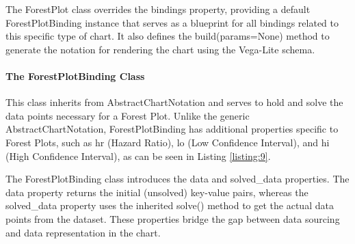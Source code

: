 The ForestPlot class overrides the bindings property, providing a
default ForestPlotBinding instance that serves as a blueprint for all
bindings related to this specific type of chart. It also defines the
build(params=None) method to generate the notation for rendering the
chart using the Vega-Lite schema.

\paragraph{The ForestPlotBinding
Class}\label{the-forestplotbinding-class}

This class inherits from AbstractChartNotation and serves to hold and
solve the data points necessary for a Forest Plot. Unlike the generic
AbstractChartNotation, ForestPlotBinding has additional properties
specific to Forest Plots, such as hr (Hazard Ratio), lo (Low Confidence
Interval), and hi (High Confidence Interval), as can be seen in Listing
\ref{listing:9}.

The ForestPlotBinding class introduces the data and solved\_data
properties. The data property returns the initial (unsolved) key-value
pairs, whereas the solved\_data property uses the inherited solve()
method to get the actual data points from the dataset. These properties
bridge the gap between data sourcing and data representation in the
chart.



